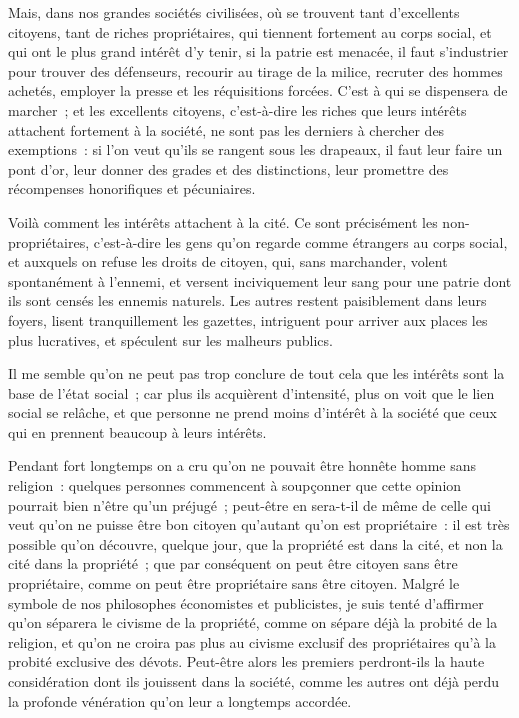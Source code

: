 \documentclass[french,twoside]{book} %
\begin{document}
Mais, dans nos grandes sociétés civilisées, où se trouvent tant d’excellents citoyens, tant de riches propriétaires, qui tiennent fortement au corps social, et qui ont le plus grand intérêt d’y tenir, si la patrie est menacée, il faut s’industrier pour trouver des défenseurs, recourir au tirage de la milice, recruter des hommes achetés, employer la presse et les réquisitions forcées. C’est à qui se dispensera de marcher ; et les excellents citoyens, c’est-à-dire les riches que leurs intérêts attachent fortement à la société, ne sont pas les derniers à chercher des exemptions : si l’on veut qu’ils se rangent sous les drapeaux, il faut leur faire un pont d’or, leur donner des grades et des distinctions, leur promettre des récompenses honorifiques et pécuniaires.\par
Voilà comment les intérêts attachent à la cité. Ce sont précisément les non-propriétaires, c’est-à-dire les gens qu’on regarde comme étrangers au corps social, et auxquels on refuse les droits de citoyen, qui, sans marchander, volent spontanément à l’ennemi, et versent inciviquement leur sang pour une patrie dont ils sont censés les ennemis naturels. Les autres restent paisiblement dans leurs foyers, lisent tranquillement les gazettes, intriguent pour arriver aux places les plus lucratives, et spéculent sur les malheurs publics.\par
Il me semble qu’on ne peut pas trop conclure de tout cela que les intérêts sont la base de l’état social ; car plus ils acquièrent d’intensité, plus on voit que le lien social se relâche, et que personne ne prend moins d’intérêt à la société que ceux qui en prennent beaucoup à leurs intérêts.\par
Pendant fort longtemps on a cru qu’on ne pouvait être honnête homme sans religion : quelques personnes commencent à soupçonner que cette opinion pourrait bien n’être qu’un préjugé ; peut-être en sera-t-il de même de celle qui veut qu’on ne puisse être bon citoyen qu’autant qu’on est propriétaire : il est très possible qu’on découvre, quelque jour, que la propriété est dans la cité, et non la cité dans la propriété ; que par conséquent on peut être citoyen sans être propriétaire, comme on peut être propriétaire sans être citoyen. Malgré le symbole de nos philosophes économistes et publicistes, je suis tenté d’affirmer qu’on séparera le civisme de la propriété, comme on sépare déjà la probité de la religion, et qu’on ne croira pas plus au civisme exclusif des propriétaires qu’à la probité exclusive des dévots. Peut-être alors les premiers perdront-ils la haute considération dont ils jouissent dans la société, comme les autres ont déjà perdu la profonde vénération qu’on leur a longtemps accordée.\par
\end{document}
